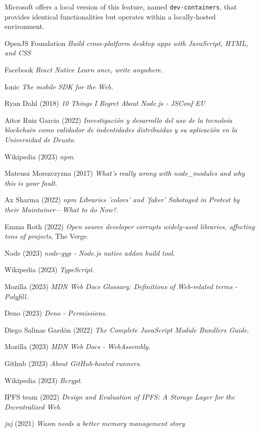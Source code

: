 \documentclass[10pt,journal,compsoc]{IEEEtran}
\begin{document}
Microsoft offers a local version of this feature, named \verb|dev-containers|, that provides identical functionalities but operates within a locally-hosted environment.


\begin{thebibliography}{9}
    OpenJS Foundation \emph{Build cross-platform desktop apps with JavaScript, HTML, and CSS}

    Facebook \emph{React Native Learn once, write anywhere.}

    Ionic \emph{The mobile SDK for the Web.}

    Ryan Dahl (2018) \emph{10 Things I Regret About Node.js - JSConf EU}

    Aitor Ruiz Garcia (2022) \emph{Investigación y desarrollo del uso de la tecnoloía blockchain como validador de indentidades distribuidas y su aplicación en la Universidad de Deusto}.

    Wikipedia (2023) \emph{npm}.

    Mateusz Morszczyzna (2017) \emph{What's really wrong with node\_modules and why this is your fault}.

    Ax Sharma (2022) \emph{npm Libraries 'colors' and 'faker' Sabotaged in Protest by their Maintainer—What to do Now?}.

    Emma Roth (2022) \emph{Open source developer corrupts widely-used libraries, affecting tons of projects}, The Verge.

    Node (2023) \emph{node-gyp - Node.js native addon build tool}.

    Wikipedia (2023) \emph{TypeScript}.

    Mozilla (2023) \emph{MDN Web Docs Glossary: Definitions of Web-related terms - Polyfill}.

    Deno (2023) \emph{Deno - Permissions}.

    Diego Salinas Gardón (2022) \emph{The Complete JavaScript Module Bundlers Guide}.

    Mozilla (2023) \emph{MDN Web Docs - WebAssembly}.

    Github (2023) \emph{About GitHub-hosted runners}.

    Wikipedia (2023) \emph{Bcrypt}.

    IPFS team (2022) \emph{Design and Evaluation of IPFS: A Storage Layer for the Decentralized Web}.

    \textit{juj} (2021) \emph{Wasm needs a better memory management story}



\end{thebibliography}
\end{document}
